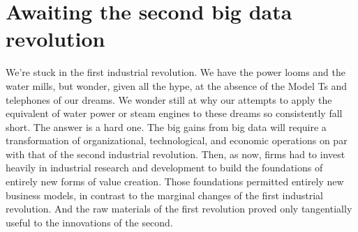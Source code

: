 \documentclass[12pt]{article}
\begin{document}






\section{Awaiting the second big data revolution}
\label{sec:awaiting-big-data}

We're stuck in the first industrial revolution. We have the power
looms and the water mills, but wonder, given all the hype, at the
absence of the Model Ts and telephones of our dreams. We wonder still
at why our attempts to apply the equivalent of water power or steam
engines to these dreams so consistently fall short. The answer is a
hard one. The big gains from big data will require a transformation of
organizational, technological, and economic operations on par with
that of the second industrial revolution. Then, as now, firms had to
invest heavily in industrial research and development to build the
foundations of entirely new forms of value creation. Those foundations
permitted entirely new business models, in contrast to the marginal
changes of the first industrial revolution. And the raw materials of
the first revolution proved only tangentially useful to the
innovations of the second.
\end{document}
